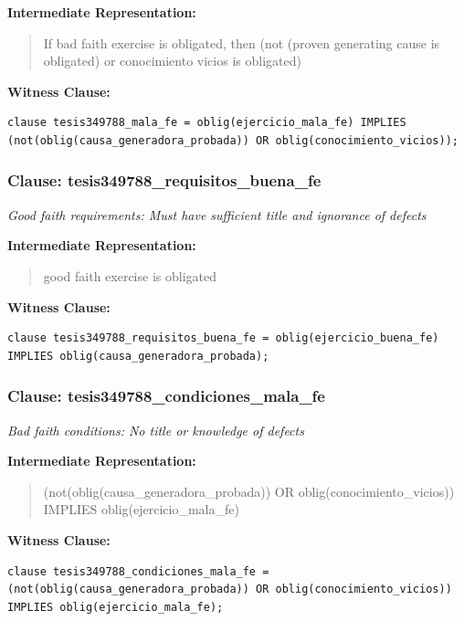 \documentclass[11pt,a4paper]{article}
\begin{document}
\textbf{Intermediate Representation:}

\begin{quote}
If bad faith exercise is obligated, then (not (proven generating cause is obligated) or conocimiento vicios is obligated)
\end{quote}

\textbf{Witness Clause:}

\begin{lstlisting}[style=witnessstyle, language=Witness]
clause tesis349788_mala_fe = oblig(ejercicio_mala_fe) IMPLIES (not(oblig(causa_generadora_probada)) OR oblig(conocimiento_vicios));
\end{lstlisting}

\subsubsection{Clause: tesis349788\_requisitos\_buena\_fe}

\textit{Good faith requirements: Must have sufficient title and ignorance of defects}

\textbf{Intermediate Representation:}

\begin{quote}
good faith exercise is obligated
\end{quote}

\textbf{Witness Clause:}

\begin{lstlisting}[style=witnessstyle, language=Witness]
clause tesis349788_requisitos_buena_fe = oblig(ejercicio_buena_fe) IMPLIES oblig(causa_generadora_probada);
\end{lstlisting}

\subsubsection{Clause: tesis349788\_condiciones\_mala\_fe}

\textit{Bad faith conditions: No title or knowledge of defects}

\textbf{Intermediate Representation:}

\begin{quote}
(not(oblig(causa\_generadora\_probada)) OR oblig(conocimiento\_vicios)) IMPLIES oblig(ejercicio\_mala\_fe)
\end{quote}

\textbf{Witness Clause:}

\begin{lstlisting}[style=witnessstyle, language=Witness]
clause tesis349788_condiciones_mala_fe = (not(oblig(causa_generadora_probada)) OR oblig(conocimiento_vicios)) IMPLIES oblig(ejercicio_mala_fe);
\end{lstlisting}
\end{document}
